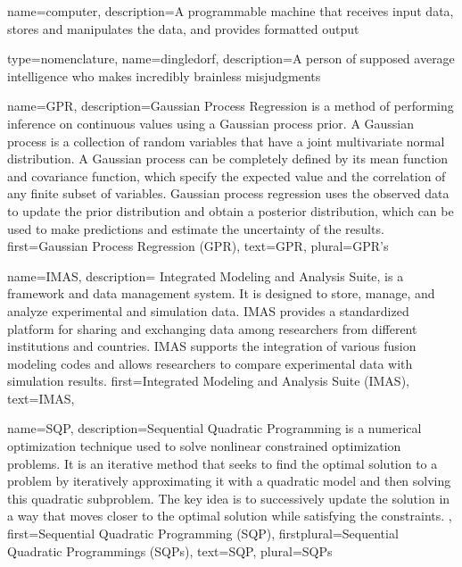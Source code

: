 {
name=computer,
description={A programmable machine that receives input data,
               stores and manipulates the data, and provides
               formatted output}
}

{
type=nomenclature,
name=dingledorf,
description={A person of supposed average intelligence who makes incredibly brainless misjudgments}
}



{%
  name={GPR},%
  description={Gaussian Process Regression is a method of performing inference on continuous values using a Gaussian process prior. A Gaussian process is a collection of random variables that have a joint multivariate normal distribution. A Gaussian process can be completely defined by its mean function and covariance function, which specify the expected value and the correlation of any finite subset of variables. Gaussian process regression uses the observed data to update the prior distribution and obtain a posterior distribution, which can be used to make predictions and estimate the uncertainty of the results.}
  first={Gaussian Process Regression (GPR)},%
  text={GPR},%
  plural={GPR's}%
}

{%
  name={IMAS},%
  description={ Integrated Modeling and Analysis Suite, is a framework and data management system. It is designed to store, manage, and analyze experimental and simulation data. IMAS provides a standardized platform for sharing and exchanging data among researchers from different institutions and countries. IMAS supports the integration of various fusion modeling codes and allows researchers to compare experimental data with simulation results.}
  first={Integrated Modeling and Analysis Suite (IMAS)},%
  text={IMAS},%
}


{%
  name={SQP},%
  description={Sequential Quadratic Programming is a numerical optimization technique used to solve nonlinear constrained optimization problems. It is an iterative method that seeks to find the optimal solution to a problem by iteratively approximating it with a quadratic model and then solving this quadratic subproblem. The key idea is to successively update the solution in a way that moves closer to the optimal solution while satisfying the constraints.
},%
  first={Sequential Quadratic Programming (SQP)},%
  firstplural={Sequential Quadratic Programmings (SQPs)},%
  text={SQP},%
  plural={SQPs}%
}


